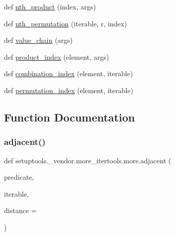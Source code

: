 \begin{DoxyCompactItemize}
\item 
def \hyperlink{namespacesetuptools_1_1__vendor_1_1more__itertools_1_1more_ab5a91cfb58c002e37dcd4efb0c035030}{nth\+\_\+product} (index, args)
\item 
def \hyperlink{namespacesetuptools_1_1__vendor_1_1more__itertools_1_1more_a0d843197e60d5372dec98fceace0ee49}{nth\+\_\+permutation} (iterable, r, index)
\item 
def \hyperlink{namespacesetuptools_1_1__vendor_1_1more__itertools_1_1more_a9de589597bd2e65a55e6981a2c779200}{value\+\_\+chain} (args)
\item 
def \hyperlink{namespacesetuptools_1_1__vendor_1_1more__itertools_1_1more_a4728a47a8a1ed85cf0312f1b1e05ea52}{product\+\_\+index} (element, args)
\item 
def \hyperlink{namespacesetuptools_1_1__vendor_1_1more__itertools_1_1more_afee4a99a5bd0ab33a46c0d2d1574aca3}{combination\+\_\+index} (element, iterable)
\item 
def \hyperlink{namespacesetuptools_1_1__vendor_1_1more__itertools_1_1more_ad851a337658e88d4c7aa6b2bd1378a87}{permutation\+\_\+index} (element, iterable)
\end{DoxyCompactItemize}


\subsection{Function Documentation}
\mbox{\label{namespacesetuptools_1_1__vendor_1_1more__itertools_1_1more_a90ed10a67aaf4c8c26a8b906d111a904}} 
\subsubsection{\texorpdfstring{adjacent()}{adjacent()}}
{\footnotesize\ttfamily def setuptools.\+\_\+vendor.\+more\+\_\+itertools.\+more.\+adjacent (\begin{DoxyParamCaption}\item[{}]{predicate,  }\item[{}]{iterable,  }\item[{}]{distance = {} }\end{DoxyParamCaption})}

